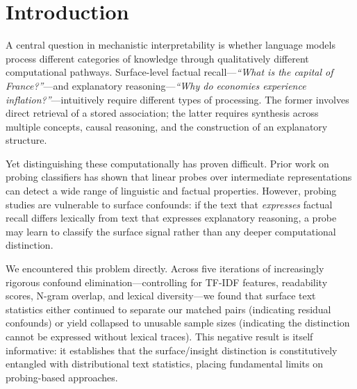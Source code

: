 \documentclass[10pt]{article}
\begin{document}
\begin{abstract}
The measurement pipeline---\textbf{Fathom}---has been extended with cognitive fingerprinting (fixed-length vector representations of reasoning signatures), causal intervention analysis (layer ablation to identify causally critical computation), and universal cognition mapping (cross-system comparison of depth topology). A preliminary universality analysis comparing transformer depth signatures to published human fMRI activation patterns yields a correspondence coefficient of $0.830$, suggesting the early-distributed/late-concentrated topology may generalize beyond transformer architectures.
\end{abstract}

\section{Introduction}

A central question in mechanistic interpretability is whether language models process different categories of knowledge through qualitatively different computational pathways. Surface-level factual recall---\textit{``What is the capital of France?''}---and explanatory reasoning---\textit{``Why do economies experience inflation?''}---intuitively require different types of processing. The former involves direct retrieval of a stored association; the latter requires synthesis across multiple concepts, causal reasoning, and the construction of an explanatory structure.

Yet distinguishing these computationally has proven difficult. Prior work on probing classifiers \citep{belinkov2022probing} has shown that linear probes over intermediate representations can detect a wide range of linguistic and factual properties. However, probing studies are vulnerable to surface confounds: if the text that \textit{expresses} factual recall differs lexically from text that expresses explanatory reasoning, a probe may learn to classify the surface signal rather than any deeper computational distinction.

We encountered this problem directly. Across five iterations of increasingly rigorous confound elimination---controlling for TF-IDF features, readability scores, N-gram overlap, and lexical diversity---we found that surface text statistics either continued to separate our matched pairs (indicating residual confounds) or yield collapsed to unusable sample sizes (indicating the distinction cannot be expressed without lexical traces). This negative result is itself informative: it establishes that the surface/insight distinction is constitutively entangled with distributional text statistics, placing fundamental limits on probing-based approaches.
\end{document}

